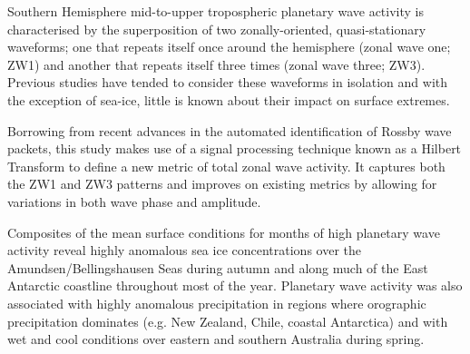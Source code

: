 Southern Hemisphere mid-to-upper tropospheric planetary wave activity is characterised by the superposition of two zonally-oriented, quasi-stationary waveforms; one that repeats itself once around the hemisphere (zonal wave one; ZW1) and another that repeats itself three times (zonal wave three; ZW3). Previous studies have tended to consider these waveforms in isolation and with the exception of sea-ice, little is known about their impact on surface extremes. 

Borrowing from recent advances in the automated identification of Rossby wave packets, this study makes use of a signal processing technique known as a Hilbert Transform to define a new metric of total zonal wave activity. It captures both the ZW1 and ZW3 patterns and improves on existing metrics by allowing for variations in both wave phase and amplitude.

Composites of the mean surface conditions for months of high planetary wave activity reveal highly anomalous sea ice concentrations over the Amundsen/Bellingshausen Seas during autumn and along much of the East Antarctic coastline throughout most of the year. Planetary wave activity was also associated with highly anomalous precipitation in regions where orographic precipitation dominates (e.g. New Zealand, Chile, coastal Antarctica) and with wet and cool conditions over eastern and southern Australia during spring. 

